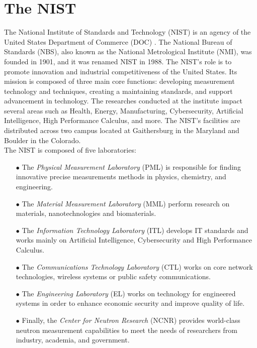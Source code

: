 
\section{The NIST}

The National Institute of Standards and Technology (NIST) is an agency of the
United States Department of Commerce (DOC) \cite{enwiki:nist}. The National
Bureau of Standards (NBS), also known as the National Metrological Institute
(NMI), was founded in 1901, and it was renamed NIST in 1988. The NIST's role is
to promote innovation and industrial competitiveness of the United States. Its
mission is composed of three main core functions: developing measurement
technology and techniques, creating a maintaining standards, and support
advancement in technology. The researches conducted at the institute impact
several areas such as Health, Energy, Manufacturing, Cybersecurity, Artificial
Intelligence, High Performance Calculus, and more. The NIST's facilities are
distributed across two campus located at Gaithersburg in the Maryland and
Boulder in the Colorado.\\

The NIST is composed of five laboratories:

\begin{itemize}
  \item[$\bullet$] The \textit{Physical Measurement Laboratory} (PML) is responsible for
    finding innovative precise measurements methods in physics, chemistry, and
    engineering.

  \item[$\bullet$] The \textit{Material Measurement Laboratory} (MML) perform research on
    materials, nanotechnologies and biomaterials.

  \item[$\bullet$] The \textit{Information Technology Laboratory} (ITL) develops IT
    standards and works mainly on Artificial Intelligence, Cybersecurity and
    High Performance Calculus.

  \item[$\bullet$] The \textit{Communications Technology Laboratory} (CTL) works on core
    network technologies, wireless systems or public safety communications.

  \item[$\bullet$] The \textit{Engineering Laboratory} (EL) works on technology for
    engineered systems in order to enhance economic security and improve quality
    of life.

  \item[$\bullet$] Finally, the \textit{Center for Neutron Research} (NCNR) provides
    world-class neutron measurement capabilities to meet the needs of
    researchers from industry, academia, and government.
\end{itemize}

